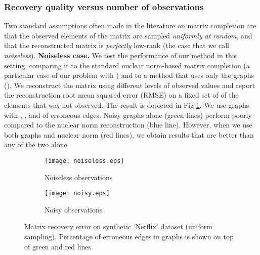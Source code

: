 \documentclass{article}
\begin{document}
\vspace{-0.1cm}
\subsubsection{Recovery quality versus number of observations}
\vspace{-0.25cm}
Two standard assumptions often made in the literature on matrix completion are that the observed elements of the matrix are sampled \textit{uniformly at random}, and that the reconstructed matrix is \textit{perfectly} low-rank (the case that we call \textit{noiseless}).
{\bf Noiseless case. } We test the performance of our method in this setting, comparing it to the standard nuclear norm-based matrix completion (a particular case of our problem with ) and to a method that uses only the graphs (). We reconstruct the matrix  using different levels of observed values and report the reconstruction root mean squared error (RMSE) on a fixed set of  of the elements that was not observed. The result is depicted in Fig \ref{fig:art_uniform_noiseless}. 
We use graphs with , , and  of erroneous edges. 
Noisy graphs alone (green lines) perform poorly compared to the nuclear norm reconstruction (blue line). However, when we use both graphs and nuclear norm (red lines), we obtain results that are better than any of the two alone.\\
\begin{figure}
\label{fig:art_uniform_all}
          \begin{subfigure}[b]{.5\linewidth}
            \centering \texttt{[image: noiseless.eps]}
            \caption{Noiseless observations}\label{fig:art_uniform_noiseless}
          \end{subfigure}
          \begin{subfigure}[b]{.5\linewidth}
            \centering\texttt{[image: noisy.eps]}
            \caption{Noisy observations}\label{fig:art_uniform_noisy}
          \end{subfigure}
        \caption{Matrix recovery error on synthetic `Netflix' dataset (uniform sampling). Percentage of erroneous edges in graphs is shown on top of green and red lines. }
	\vspace{-0.45cm}
\end{figure}
\end{document}
